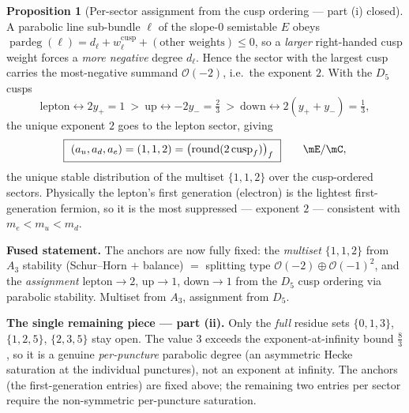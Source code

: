 \documentclass[11pt,a4paper]{article}
\newcommand{\pardeg}{\operatorname{pardeg}}
\theoremstyle{definition}
\newtheorem{proposition}{Proposition}
\begin{document}
\begin{proposition}[Per-sector assignment from the cusp ordering --- part (i) closed]
A parabolic line sub-bundle $\ell$ of the slope-$0$ semistable $E$ obeys
$\pardeg(\ell)=d_\ell+w^{\mathrm{cusp}}_\ell+(\text{other weights})\le 0$, so a \emph{larger} right-handed
cusp weight forces a \emph{more negative} degree $d_\ell$. Hence the sector with the largest cusp carries
the most-negative summand $\mathcal O(-2)$, i.e.\ the exponent $2$. With the $D_5$ cusps
\[
  \text{lepton}\leftrightarrow 2y_+=1\ >\ \text{up}\leftrightarrow -2y_-=\tfrac23\ >\ \text{down}\leftrightarrow 2(y_++y_-)=\tfrac13 ,
\]
the unique exponent $2$ goes to the lepton sector, giving
\begin{equation}
  \boxed{\ (a_u,a_d,a_e)=(1,1,2)=\bigl(\operatorname{round}(2\,\mathrm{cusp}_f)\bigr)_f\ }\qquad\mE/\mC ,
\end{equation}
the unique stable distribution of the multiset $\{1,1,2\}$ over the cusp-ordered sectors. Physically the
lepton's first generation (electron) is the lightest first-generation fermion, so it is the most
suppressed --- exponent $2$ --- consistent with $m_e<m_u<m_d$.
\end{proposition}

\noindent\textbf{Fused statement.} The anchors are now fully fixed: the \emph{multiset} $\{1,1,2\}$ from
$A_3$ stability (Schur--Horn $+$ balance) $=$ splitting type $\mathcal O(-2)\oplus\mathcal O(-1)^2$, and
the \emph{assignment} lepton$\to2$, up$\to1$, down$\to1$ from the $D_5$ cusp ordering via parabolic
stability. Multiset from $A_3$, assignment from $D_5$.
\par\smallskip\noindent\textbf{The single remaining piece --- part (ii).}
Only the \emph{full} residue sets $\{0,1,3\}$, $\{1,2,5\}$, $\{2,3,5\}$ stay open. The value $3$ exceeds
the exponent-at-infinity bound $\tfrac83$, so it is a genuine \emph{per-puncture} parabolic degree (an
asymmetric Hecke saturation at the individual punctures), not an exponent at infinity. The anchors (the
first-generation entries) are fixed above; the remaining two entries per sector require the non-symmetric
per-puncture saturation. \mC
\par\smallskip
\end{document}
